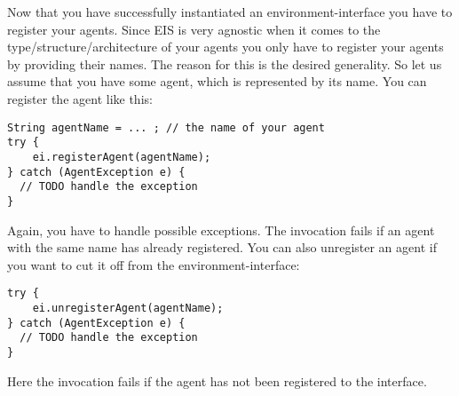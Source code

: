 \documentclass[a4]{article}
\newcommand{\EIS}{\textsf{EIS}\xspace}
\begin{document}
Now that you have successfully instantiated an environment-interface you have to register your agents.
Since \EIS is very agnostic when it comes to the type/structure/architecture of your agents you only have to
register your agents by providing their names. The reason for this is the desired generality. 
So let us assume that you have some agent, which is represented by its name.
You can register the agent like this:
\begin{verbatim}
String agentName = ... ; // the name of your agent
try {
    ei.registerAgent(agentName);
} catch (AgentException e) {
  // TODO handle the exception
}
\end{verbatim}
Again, you have to handle possible exceptions. 
The invocation fails if an agent with the same name has already registered.
You can also unregister an agent if you want to cut it off from the environment-interface:
\begin{verbatim}
try {
    ei.unregisterAgent(agentName);
} catch (AgentException e) {
  // TODO handle the exception
}
\end{verbatim}
Here the invocation fails if the agent has not been registered to the interface.
\end{document}
